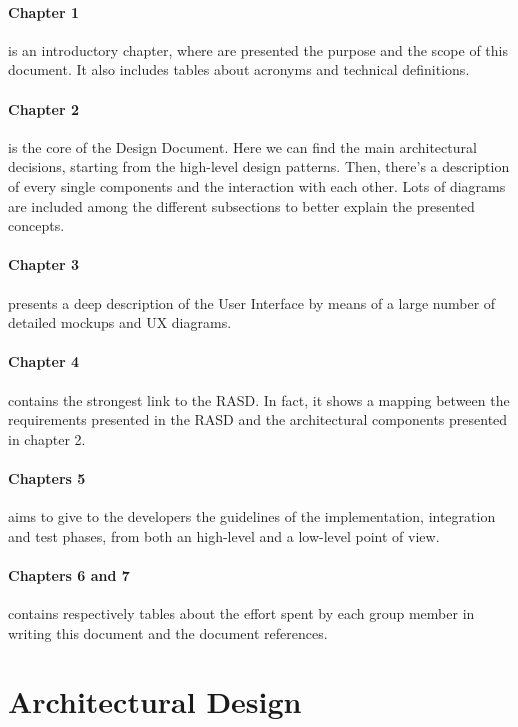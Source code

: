 \documentclass[]{article}
\begin{document}
			\paragraph{Chapter 1} is an introductory chapter, where are presented the purpose and the scope of this document. It also includes tables about acronyms and technical definitions.	
			
			\paragraph{Chapter 2} is the core of the Design Document. Here we can find the main architectural decisions, starting from the high-level design patterns. Then, there's a description of every single components and the interaction with each other. Lots of diagrams are included among the different subsections to better explain the presented concepts.
			
			\paragraph{Chapter 3} presents a deep description of the User Interface by means of a large number of detailed mockups and UX diagrams.
			
			\paragraph{Chapter 4} contains the strongest link to the RASD. In fact, it shows a mapping between the requirements presented in the RASD and the architectural components presented in chapter 2.
			
			\paragraph{Chapters 5} aims to give to the developers the guidelines of the implementation, integration and test phases, from both an high-level and a low-level point of view.
		
			\paragraph{Chapters 6 and 7} contains respectively tables about the effort spent by each group member in writing this document and the document references.
			\newpage
			
		
		\section{Architectural Design}
			
\end{document}
